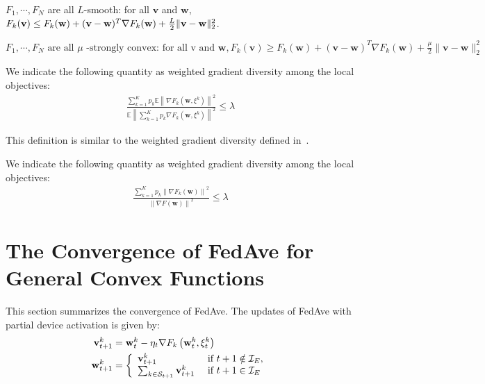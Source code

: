 \begin{assumption}[L-smooth]
$F_{1}, \cdots, F_{N}$ are all $L$-smooth: for all  $\mathbf{v}$  and $\mathbf{w}$, $F_{k}(\mathbf{v}) \leq F_{k}(\mathbf{w})+(\mathbf{v}- \\ \mathbf{w})^{T} \nabla F_{k}(\mathbf{w})+\frac{L}{2}\|\mathbf{v}-\mathbf{w}\|_{2}^{2}$.
\label{ass:lsmooth}
\end{assumption}
\begin{assumption}
$	F_{1}, \cdots, F_{N} \text { are all } \mu \text { -strongly convex: for all v and } \mathbf{w}, F_{k}(\mathbf{v}) \geq F_{k}(\mathbf{w})+(\mathbf{v}-\mathbf{w})^{T} \nabla F_{k}(\mathbf{w})+\frac{\mu}{2}\|\mathbf{v}-\mathbf{w}\|_{2}^{2}$
\label{ass:stroncvx}
\end{assumption}

\begin{definition}
	We indicate the following quantity as weighted gradient diversity among the local 
	objectives:
	\begin{align*}
		\frac{\sum_{k=1}^K p_k  \mathbb{E}\left\|\nabla F_{k}\left(\mathbf{w}, \xi^{k}\right)\right\|^{2} }{\mathbb{E}\left\| \sum_{k=1}^K p_k   \nabla F_{k}\left(\mathbf{w}, \xi^{k}\right)\right\|^{2} } \leq \lambda 
	\end{align*}
\end{definition}
This definition is similar to the weighted gradient diversity defined in~\cite{haddadpour2019convergence}.

\begin{definition}
	We indicate the following quantity as weighted gradient diversity among the local 
	objectives:
	\begin{align*}
		\frac{\sum_{k=1}^K p_k \left\|\nabla F_{k}\left(\mathbf{w}\right)\right\|^{2} }{\left\|   \nabla F\left(\mathbf{w}\right)\right\|^{2} } \leq \lambda 
	\end{align*}
\end{definition}

\section{The Convergence of FedAve for General Convex Functions}
This section summarizes the convergence of FedAve.
The updates of FedAve with partial device activation is given by: 
\begin{align} 
\mathbf{v}_{t+1}^{k} &=\mathbf{w}_{t}^{k}-\eta_{t} \nabla F_{k}\left(\mathbf{w}_{t}^{k}, \xi_{t}^{k}\right) \\ \mathbf{w}_{t+1}^{k} &=\left\{\begin{array}{ll}\mathbf{v}_{t+1}^{k} & \text { if } t+1 \notin \mathcal{I}_{E}, \\ 
\sum_{k \in {\mathcal{S}}_{t+1}} \mathbf{v}_{t+1}^{k} & \text { if } t+1 \in \mathcal{I}_{E}\end{array}\right.
\end{align}

